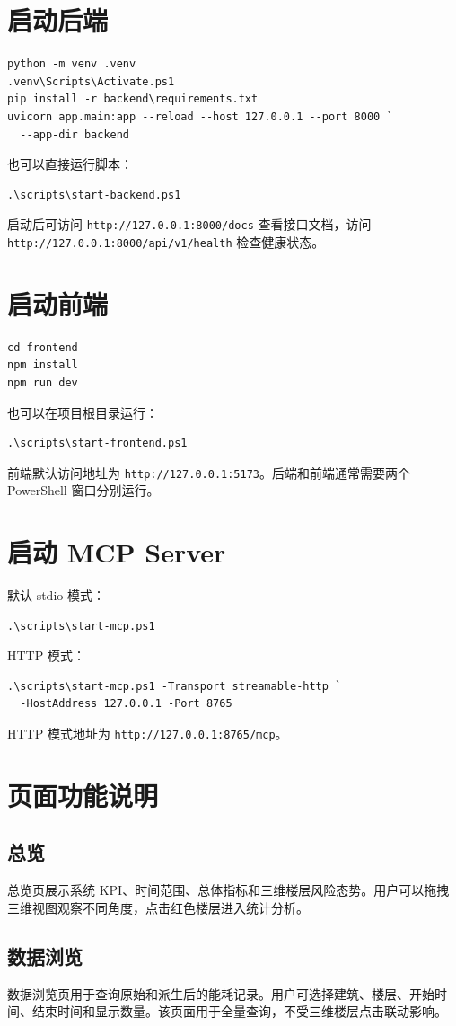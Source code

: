 \documentclass[12pt,a4paper]{ctexart}
\newcommand{\code}[1]{{\footnotesize\nolinkurl{#1}}}
\begin{document}
\section{启动后端}
\begin{verbatim}
python -m venv .venv
.venv\Scripts\Activate.ps1
pip install -r backend\requirements.txt
uvicorn app.main:app --reload --host 127.0.0.1 --port 8000 `
  --app-dir backend
\end{verbatim}
也可以直接运行脚本：
\begin{verbatim}
.\scripts\start-backend.ps1
\end{verbatim}
启动后可访问 \code{http://127.0.0.1:8000/docs} 查看接口文档，访问 \code{http://127.0.0.1:8000/api/v1/health} 检查健康状态。

\section{启动前端}
\begin{verbatim}
cd frontend
npm install
npm run dev
\end{verbatim}
也可以在项目根目录运行：
\begin{verbatim}
.\scripts\start-frontend.ps1
\end{verbatim}
前端默认访问地址为 \code{http://127.0.0.1:5173}。后端和前端通常需要两个 PowerShell 窗口分别运行。

\section{启动 MCP Server}
默认 stdio 模式：
\begin{verbatim}
.\scripts\start-mcp.ps1
\end{verbatim}
HTTP 模式：
\begin{verbatim}
.\scripts\start-mcp.ps1 -Transport streamable-http `
  -HostAddress 127.0.0.1 -Port 8765
\end{verbatim}
HTTP 模式地址为 \code{http://127.0.0.1:8765/mcp}。

\section{页面功能说明}
\subsection{总览}
总览页展示系统 KPI、时间范围、总体指标和三维楼层风险态势。用户可以拖拽三维视图观察不同角度，点击红色楼层进入统计分析。

\subsection{数据浏览}
数据浏览页用于查询原始和派生后的能耗记录。用户可选择建筑、楼层、开始时间、结束时间和显示数量。该页面用于全量查询，不受三维楼层点击联动影响。
\end{document}
